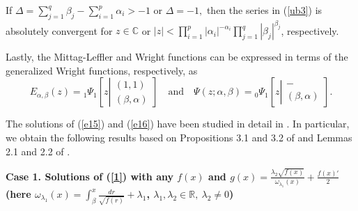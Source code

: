 \documentclass[12pt]{amsart}
\begin{document}
If $\Delta=\sum\limits_{j=1}^q \beta_j-\sum\limits_{i=1}^p \alpha_i>-1$ or $\Delta=-1,$ then the series in (\ref{ub3}) is absolutely convergent for $z\in \mathbb{C}$ or $|z|<\prod\limits_{i=1}^p|\alpha_i|^{-\alpha_i}\prod\limits_{j=1}^q|\beta_j|^{\beta_j}$, respectively. 

Lastly, the Mittag-Leffler and Wright functions can be expressed in terms of the generalized Wright functions, respectively, as
\begin{equation*}
E_{\alpha,\beta}(z) = {}_1\Psi_1\left[z\left|\begin{array}{c}
(1,1)\\
(\beta,\alpha)
\end{array}\right.
\right]\quad\mbox{and}\quad 
\Psi\left(z;\alpha,\beta\right) ={}_0\Psi_{1}\left[z\left|\begin{array}{c}
-\\
(\beta,\alpha)
\end{array}\right.\right]. 
\end{equation*}

The solutions of (\ref{e15}) and (\ref{e16}) have been studied in detail in 
\cite{ourFCAA,ourJMP}. In particular, we obtain the following results based on Propositions 3.1 and 3.2 of \cite{ourFCAA} and Lemmas 2.1 and 2.2 of \cite{ourJMP}.

\textbf{Case 1. Solutions of (\ref{1}) with any $f(x)$ and $g(x)=\frac{\lambda_2\sqrt{f(x)}}{\omega_{\lambda_1}(x)}+\frac{f(x)'}{2}$ (here $\omega_{\lambda_1}(x)=\int_\beta^x \frac{dr}{\sqrt{f(r)}} +\lambda_1$, $\lambda_1,\lambda_2\in \mathbb{R},~ \lambda_2\ne 0$)}
\end{document}
